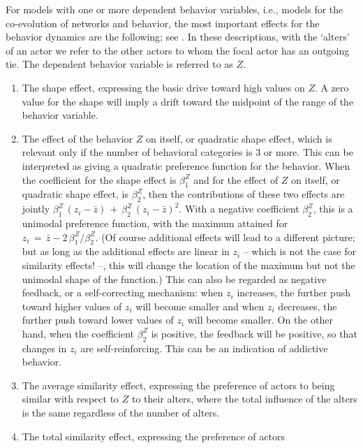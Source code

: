 \documentclass[a4paper,fleqn,11pt]{article}
\newcommand{\+}{\, + \,}
\begin{document}
For models with one or more dependent behavior variables, i.e.,
models for the co-evolution of networks and behavior,
the most important effects for the behavior dynamics are the following;
see \citet*{SteglichEA10}.
In these descriptions, with the `alters' of an actor
we refer to the other actors to whom
the focal actor has an outgoing tie.
The dependent behavior variable is referred to as $Z$.
\begin{enumerate}
\item The shape effect, expressing the basic drive toward high values on $Z$.
      A zero value for the shape will imply a drift toward the midpoint
      of the range of the behavior variable.
\item The effect of the behavior $Z$ on itself,
      or quadratic shape effect, which is relevant
      only if the number of behavioral categories is 3 or more.
      This can be interpreted as giving a quadratic preference function
      for the behavior.
      When the coefficient for the shape effect is $\beta^Z_1$ and for the
      effect of $Z$ on itself, or quadratic shape effect, is $\beta^Z_2$,
      then the contributions
      of these two effects are jointly $\beta^Z_1\, (z_i - \bar z) \,+\,
                   \beta^Z_2\, (z_i - \bar z)^2$.
      With a negative coefficient $\beta^Z_2$, this
      is a unimodal preference function, with the maximum attained
      for $z_i \,=\, \bar z - 2\,\beta^Z_1/\beta^Z_2$.
      (Of course additional effects will lead to a different picture;
      but as long as the additional effects are linear in $z_i$ -- which is not
      the case for similarity effects! --, this will change the location of the maximum
      but not the unimodal shape of the function.)
      This can also be regarded as negative feedback, or a self-correcting
      mechanism: when $z_i$ increases, the further push toward higher values
      of $z_i$ will become smaller and when $z_i$ decreases, the further push toward lower values
      of $z_i$ will become smaller. On the other hand, when the coefficient $\beta^Z_2$
      is positive, the feedback will be positive, so that changes in $z_i$
      are self-reinforcing. This can be an indication of addictive behavior.
\item The average similarity effect, expressing the preference of actors
      to being similar with respect to $Z$ to their alters,
      where the total influence of the alters is the same
      regardless of the number of alters.
\item The total similarity effect, expressing the preference of actors

\end{enumerate}
\end{document}
